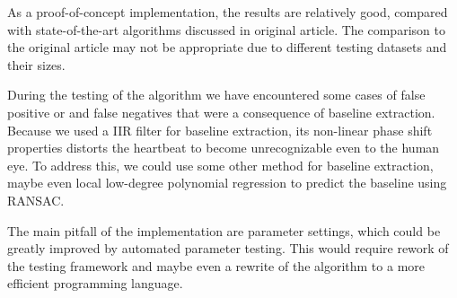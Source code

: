 \documentclass[fleqn,moreauthors,10pt]{ds_report}
\begin{document}
As a proof-of-concept implementation, the results are relatively good, compared with state-of-the-art algorithms discussed in original article. The comparison to the original article may not be appropriate due to different testing datasets and their sizes.

During the testing of the algorithm we have encountered some cases of false positive or and false negatives that were a consequence of baseline extraction. Because we used a IIR filter for baseline extraction, its non-linear phase shift properties distorts the heartbeat to become unrecognizable even to the human eye. To address this, we could use some other method for baseline extraction, maybe even local low-degree polynomial regression to predict the baseline using RANSAC.

The main pitfall of the implementation are parameter settings, which could be greatly improved by automated parameter testing. This would require rework of the testing framework and maybe even a rewrite of the algorithm to a more efficient programming language. 



\end{document}
